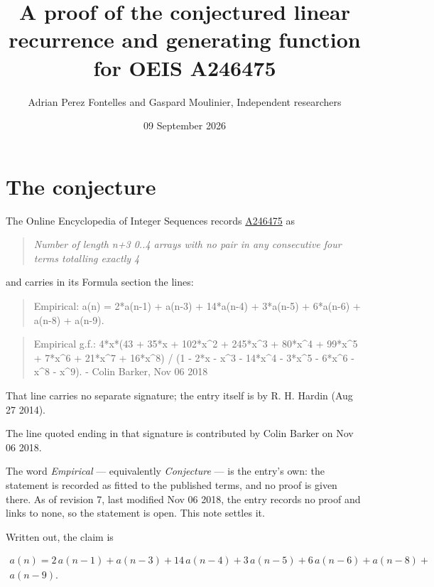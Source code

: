 \documentclass[11pt]{article}
\title{A proof of the conjectured linear recurrence and generating function for OEIS A246475}
\author{Adrian Perez Fontelles and Gaspard Moulinier, Independent researchers}
\date{09 September 2026}
\theoremstyle{definition}
\begin{document}
\maketitle
\section{The conjecture}

The Online Encyclopedia of Integer Sequences records \href{https://oeis.org/A246475}{A246475} as

\begin{quote}\itshape Number of length n+3 0..4 arrays with no pair in any consecutive four terms totalling exactly 4\end{quote}

and carries in its Formula section the lines:

\begin{quote}\ttfamily Empirical: a(n) = 2*a(n-1) + a(n-3) + 14*a(n-4) + 3*a(n-5) + 6*a(n-6) + a(n-8) + a(n-9).\end{quote}

\begin{quote}\ttfamily Empirical g.f.: 4*x*(43 + 35*x + 102*x\textasciicircum{}2 + 245*x\textasciicircum{}3 + 80*x\textasciicircum{}4 + 99*x\textasciicircum{}5 + 7*x\textasciicircum{}6 + 21*x\textasciicircum{}7 + 16*x\textasciicircum{}8) / (1 - 2*x - x\textasciicircum{}3 - 14*x\textasciicircum{}4 - 3*x\textasciicircum{}5 - 6*x\textasciicircum{}6 - x\textasciicircum{}8 - x\textasciicircum{}9). - Colin Barker, Nov 06 2018\end{quote}

That line carries no separate signature; the entry itself is by R. H. Hardin (Aug 27 2014).

The line quoted ending in that signature is contributed by Colin Barker on Nov 06 2018.

The word {\itshape Empirical} --- equivalently {\itshape Conjecture} --- is the entry's own: the statement is recorded as fitted to the published terms, and no proof is given there. As of revision 7, last modified Nov 06 2018, the entry records no proof and links to none, so the statement is open. This note settles it.

Written out, the claim is

\begin{multline*} a(n) = 2\,a(n-1) + a(n-3) + 14\,a(n-4) + 3\,a(n-5) + 6\,a(n-6) + a(n-8) + \\ a(n-9). \end{multline*}
\end{document}
